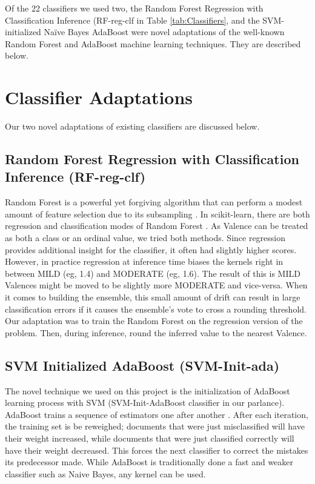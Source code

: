 Of the 22 classifiers we used two, the Random Forest Regression with Classification Inference (\textsf{RF-reg-clf} in Table \ref{tab:Classifiers}, and the SVM-initialized
Na\"{i}ve Bayes AdaBoost were novel adaptations of the well-known
Random Forest \cite{breiman01, ho95} and AdaBoost \cite{adaboost} machine learning
techniques. They are described below.

\section{Classifier Adaptations}\label{sec:newml}

Our two novel adaptations of existing classifiers are discussed below. 

\subsection{Random Forest Regression with Classification Inference (RF-reg-clf)}
Random Forest is a powerful yet forgiving algorithm that can perform a modest amount of feature selection due to its subsampling \cite{breiman01, ho95}. In \textsf{scikit-learn}, there are both regression and classification modes of Random Forest \cite{scikit-learn}. As Valence can be treated as both a class or an ordinal value, we tried both methods. Since regression provides additional insight for the classifier, it often had slightly higher scores. However, in practice regression at inference time biases the kernels right in between \textsf{MILD} (eg, 1.4) and \textsf{MODERATE} (eg, 1.6). The result of this is \textsf{MILD} Valences might be moved to be slightly more \textsf{MODERATE} and vice-versa. When it comes to building the ensemble, this small amount of drift can result in large classification errors if it causes the ensemble's vote to cross a rounding threshold. Our adaptation was to train the Random Forest on the regression version of the problem. Then, during inference, round the inferred value to the nearest Valence. 

\subsection{SVM Initialized AdaBoost (SVM-Init-ada)}
The novel technique we used on this project is the initialization of AdaBoost learning
process with SVM (\textsf{SVM-Init-AdaBoost} classifier in our parlance). AdaBoost trains
a sequence of  estimators one after another \cite{adaboost}. After each iteration, the training set is be reweighed; documents that were just misclassified will have their weight increased, while documents that were just classified correctly will have their weight decreased. This forces the next classifier to correct the mistakes its predecessor made. While AdaBoost is traditionally done a fast and weaker classifier such as Naive Bayes, any kernel can be used. 

